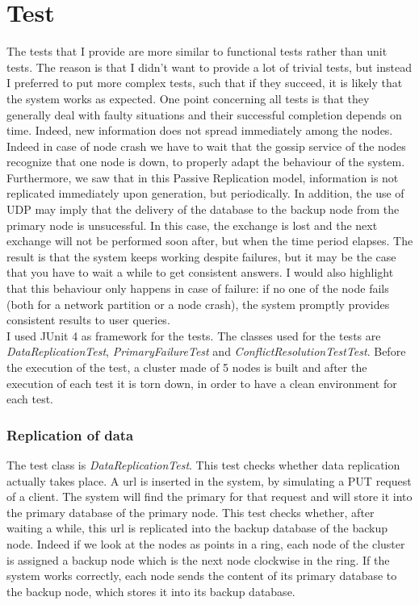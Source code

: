 \documentclass{article}
\begin{document}
\section{Test}
The tests that I provide are more similar to functional tests rather than unit tests. The reason is that I didn't want to provide a lot of trivial tests, but instead I preferred to put more complex tests, such that if they succeed, it is likely that the system works as expected. One point concerning all tests is that they generally deal with faulty situations and their successful completion depends on time. Indeed, new information does not spread immediately among the nodes. Indeed in case of node crash we have to wait that the gossip service of the nodes recognize that one node is down, to properly adapt the behaviour of the system. Furthermore, we saw that in this Passive Replication model, information is not replicated immediately upon generation, but periodically. In addition, the use of UDP may imply that the delivery of the database to the backup node from the primary node is unsucessful. In this case, the exchange is lost and the next exchange will not be performed soon after, but when the time period elapses. The result is that the system keeps working despite failures, but it may be the case that you have to wait a while to get consistent answers. I would also highlight that this behaviour only happens in case of failure: if no one of the node fails (both for a network partition or a node crash), the system promptly provides consistent results to user queries. \\
I used JUnit 4 as framework for the tests. The classes used for the tests are \textit{DataReplicationTest}, \textit{PrimaryFailureTest} and \textit{ConflictResolutionTestTest}. Before the execution of the test, a cluster made of 5 nodes is built and after the execution of each test it is torn down, in order to have a clean environment for each test.


\subsubsection{Replication of data}
The test class is \textit{DataReplicationTest}. This test checks whether data replication actually takes place. A url is inserted in the system, by simulating a PUT request of a client. The system will find the primary for that request and will store it into the primary database of the primary node. This test checks whether, after waiting a while, this url is replicated into the backup database of the backup node. Indeed if we look at the nodes as points in a ring, each node of the cluster is assigned a backup node which is the next node clockwise in the ring. If the system works correctly, each node sends the content of its primary database to the backup node, which stores it into its backup database.
\end{document}
